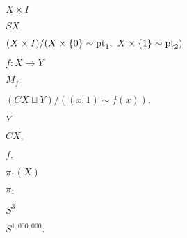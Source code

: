 \documentclass[10pt]{book}
\begin{document}
\begin{mdSnippets}
\begin{mdInlineSnippet}[26d34f122c7d90a3b9b52a8fe00c7c92]
$X \times I$\end{mdInlineSnippet}%
\begin{mdInlineSnippet}%
$SX$\end{mdInlineSnippet}%
\begin{mdInlineSnippet}[867edc56cf3e14f273b0af096d63f90e]%
$(X \times I) / (X \times \{0\} \sim \operatorname{pt}_1,\ X \times \{1\} \sim \operatorname{pt}_2)$\end{mdInlineSnippet}%
\begin{mdInlineSnippet}[2385fde6b300ad088e0c2711c9da8a74]%
$f: X \to Y$\end{mdInlineSnippet}%
\begin{mdInlineSnippet}[5feade52f51b7f09e56060524e6a7bc0]%
$M_f$\end{mdInlineSnippet}%
\begin{mdInlineSnippet}[3d5af879b9a2845f2e22776311d3465c]%
$(CX \sqcup Y) / ((x,1) \sim f(x)).$\end{mdInlineSnippet}%
\begin{mdInlineSnippet}[57cec4137b614c87cb4e24a3d003a3e0]%
$Y$\end{mdInlineSnippet}%
\begin{mdInlineSnippet}[8f394246ac7b87ad5d7021366a3a1982]%
$CX,$\end{mdInlineSnippet}%
\begin{mdInlineSnippet}[e3cde3f61de01c172fa395c723c68d2f]%
$f.$\end{mdInlineSnippet}%
\begin{mdInlineSnippet}[38823755931fd0c754e6cb15c9f5cab5]%
$\pi_1(X)$\end{mdInlineSnippet}%
\begin{mdInlineSnippet}[4d50b474c7a8b790bdd18aa1ee199f42]%
$\pi_1$\end{mdInlineSnippet}%
\begin{mdInlineSnippet}[903faf99a14b55b7ad3d1020786c49a8]%
$S^3$\end{mdInlineSnippet}%
\begin{mdInlineSnippet}%
$S^{1,000,000}.$\end{mdInlineSnippet}%
\begin{mdInlineSnippet}%

\end{mdInlineSnippet}
\end{mdSnippets}
\end{document}
